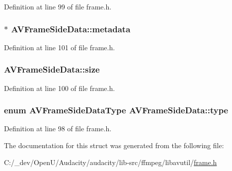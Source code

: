 Definition at line 99 of file frame.\+h.

\subsubsection[{\texorpdfstring{metadata}{metadata}}]{$\ast$ A\+V\+Frame\+Side\+Data\+::metadata}\hypertarget{struct_a_v_frame_side_data_a1b5aa30410c54c8aebefa1a791616e9f}{}\label{struct_a_v_frame_side_data_a1b5aa30410c54c8aebefa1a791616e9f}


Definition at line 101 of file frame.\+h.

\subsubsection[{\texorpdfstring{size}{size}}]{ A\+V\+Frame\+Side\+Data\+::size}\hypertarget{struct_a_v_frame_side_data_aa8418cdc71a76dfab523445b17f10028}{}\label{struct_a_v_frame_side_data_aa8418cdc71a76dfab523445b17f10028}


Definition at line 100 of file frame.\+h.

\subsubsection[{\texorpdfstring{type}{type}}]{\setlength{\rightskip}{0pt plus 5cm}enum {\bf A\+V\+Frame\+Side\+Data\+Type} A\+V\+Frame\+Side\+Data\+::type}\hypertarget{struct_a_v_frame_side_data_a07ff3499827c124591ff4bae6f68eec0}{}\label{struct_a_v_frame_side_data_a07ff3499827c124591ff4bae6f68eec0}


Definition at line 98 of file frame.\+h.



The documentation for this struct was generated from the following file\+:\begin{DoxyCompactItemize}
\item 
C\+:/\+\_\+dev/\+Open\+U/\+Audacity/audacity/lib-\/src/ffmpeg/libavutil/\hyperlink{ffmpeg_2libavutil_2frame_8h}{frame.\+h}\end{DoxyCompactItemize}

